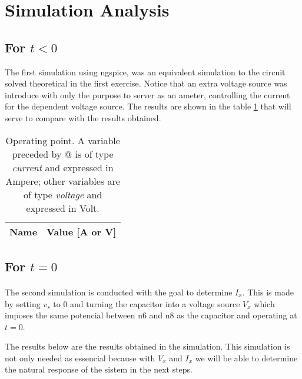 \newpage{}

\section{Simulation Analysis}
\label{sec:simulation}
\paragraph{}


\subsection{For $t<0$}

\par The first simulation using ngspice, was an equivalent simulation to the circuit solved theoretical in the first exercise. Notice that an extra voltage source was introduce with only the purpose to server as an ameter, controlling the current for the dependent voltage source. The results are shown in the table \ref{sim1} that will serve to compare with the results obtained.

\begin{table}[H]
  \centering
  \begin{tabular}{|c|c|}
    \hline    
    {\bf Name} & {\bf Value [A or V]} \\ \hline
    
  \end{tabular}
  \caption{Operating point. A variable preceded by @ is of type {\em current}
    and expressed in Ampere; other variables are of type {\it voltage} and expressed in
    Volt.}
  \label{sim1}
\end{table}

\subsection{For $t=0$}
\paragraph{}
The second simulation is conducted with the goal to determine $I_x$. This is made by setting $v_s$ to 0 and turning the capacitor into a voltage source $V_x$ which imposes the same potencial between n6 and n8 as the capacitor and operating at $t=0$. 

\par The results below are the results obtained in the simulation. This simulation is not only needed as essencial because with $V_x$ and $I_x$ we will be able to determine the natural response of the sistem in the next steps. 

